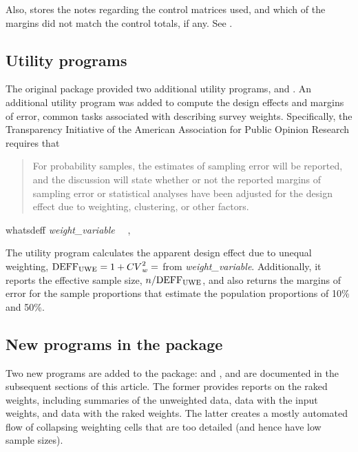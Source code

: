 Also,  stores the notes regarding the control matrices
used, and which of the margins did not match the control totals, if any.
See .

\subsection{Utility programs}
\label{subsec:utility}

The original package  provided two additional utility programs,
 and . An additional utility program was added
to compute the design effects and margins of error, common tasks associated
with describing survey weights. Specifically, the Transparency Initiative
of the American Association for Public Opinion Research
\citep{aapor:2014:ti:terms}
requires that

\begin{quote}
For probability samples, the estimates of sampling error will be reported, and the discussion will state whether or not the reported margins of sampling error or statistical analyses have been adjusted for the design effect due to weighting, clustering, or other factors.
\end{quote}

\begin{stsyntax}
whatsdeff
{\it weight\_variable}
\optif\
\optin\
,
\end{stsyntax}

The utility program  calculates the apparent design effect due to unequal weighting,
${\rm DEFF_{UWE}}=1 + {CV}^2_w = $  from  {\it weight\_variable}.
Additionally, it reports the effective sample size, $n/{\rm DEFF_{UWE}}$, and also returns
the margins of error for the sample proportions that estimate the population proportions of
10\% and 50\%.

\begin{stlog}
\nullskip
\end{stlog}

\subsection{New programs in the package}

Two new programs are added to the package:  and ,
and are documented in the subsequent sections of this article. The former provides reports on the raked weights,
including summaries of the unweighted data, data with the input weights, and data with the raked weights. 
The latter creates a mostly automated flow of collapsing weighting cells that are too detailed
(and hence have low sample sizes).

